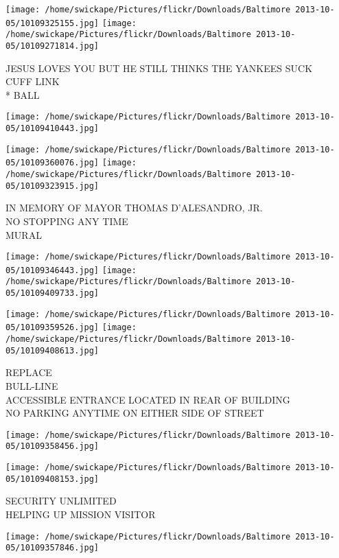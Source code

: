 \documentclass[10pt,letterpaper]{article}
\begin{document}
\vspace{0.25in}
\texttt{[image: /home/swickape/Pictures/flickr/Downloads/Baltimore 2013-10-05/10109325155.jpg]}
\texttt{[image: /home/swickape/Pictures/flickr/Downloads/Baltimore 2013-10-05/10109271814.jpg]}

JESUS LOVES YOU BUT HE STILL THINKS THE YANKEES SUCK\\
CUFF LINK\\
* BALL
\pagebreak

\texttt{[image: /home/swickape/Pictures/flickr/Downloads/Baltimore 2013-10-05/10109410443.jpg]}

\vspace{0.25in}
\texttt{[image: /home/swickape/Pictures/flickr/Downloads/Baltimore 2013-10-05/10109360076.jpg]}
\texttt{[image: /home/swickape/Pictures/flickr/Downloads/Baltimore 2013-10-05/10109323915.jpg]}

IN MEMORY OF MAYOR THOMAS D'ALESANDRO, JR.\\
NO STOPPING ANY TIME\\
MURAL
\pagebreak

\texttt{[image: /home/swickape/Pictures/flickr/Downloads/Baltimore 2013-10-05/10109346443.jpg]}
\texttt{[image: /home/swickape/Pictures/flickr/Downloads/Baltimore 2013-10-05/10109409733.jpg]}

\texttt{[image: /home/swickape/Pictures/flickr/Downloads/Baltimore 2013-10-05/10109359526.jpg]}
\texttt{[image: /home/swickape/Pictures/flickr/Downloads/Baltimore 2013-10-05/10109408613.jpg]}

REPLACE\\
BULL{-}LINE\\
ACCESSIBLE ENTRANCE LOCATED IN REAR OF BUILDING\\
NO PARKING ANYTIME ON EITHER SIDE OF STREET
\pagebreak

\texttt{[image: /home/swickape/Pictures/flickr/Downloads/Baltimore 2013-10-05/10109358456.jpg]}

\vspace{0.25in}
\texttt{[image: /home/swickape/Pictures/flickr/Downloads/Baltimore 2013-10-05/10109408153.jpg]}

SECURITY UNLIMITED\\
HELPING UP MISSION VISITOR
\pagebreak

\texttt{[image: /home/swickape/Pictures/flickr/Downloads/Baltimore 2013-10-05/10109357846.jpg]}
\end{document}
